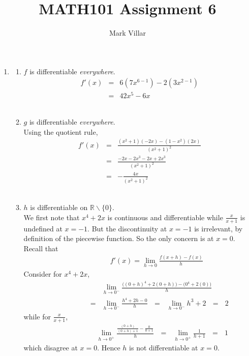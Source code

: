 \documentclass[12pt]{amsart}
\title{MATH101 Assignment 6}
\author{Mark Villar}
\begin{document}
 

\maketitle 

\begin{enumerate}
	
	\item 
	
		\begin{enumerate}
		
			\item $f$ is differentiable \emph{everywhere}.
				\begin{eqnarray}
					f'(x) & = & 6(7x^{6-1})-2(3x^{2-1}) \nonumber \\
					& = & 42 x^5-6x \nonumber
				\end{eqnarray} \\
							
			\item $g$ is differentiable \emph{everywhere}. \\
			Using the quotient rule,
				\begin{eqnarray}
					f'(x) & = &	\frac{(x^2+1)(-2x)-(1-x^2)(2x)}{(x^2+1)^2} \nonumber \\
					& = & \frac{-2x-2x^3-2x+2x^3}{(x^2+1)^2} \nonumber \\
					& = & -\frac{4x}{(x^2+1)^2} \nonumber
				\end{eqnarray}	\\	
									
			\item $h$ is differentiable on $\mathbb{R}\backslash\{0\}$. \\
			We first note that $x^4+2x$ is continuous and differentiable while $\frac{x}{x+1}$ is undefined 			at $x=-1$.  But the discontinuity at $x=-1$ is irrelevant, by definition of the piecewise function.
			So the only concern is at $x=0$. Recall that 
				\begin{eqnarray}
					\hspace{2cm} f'(x) = \lim_{h\rightarrow0} \frac{f(x+h)-f(x)}{h} \nonumber
				\end{eqnarray}
			Consider for $x^4+2x$,
				\begin{eqnarray}
					\hspace{2cm}& &\lim_{h\rightarrow0^-}\frac{\big((0+h)^4+2(0+h)\big)-\big(0^4+2(0)						\big)}{h} \nonumber \\
					& = & \lim_{h\rightarrow0^-} \frac{h^4+2h-0}{h} \text{ } = \text{ } \lim_{h\rightarrow0^-} 					h^3+2 \text{ } = \text{ } 2 \nonumber
				\end{eqnarray} 
			while for $\frac{x}{x+1}$,
				\begin{eqnarray}
					\hspace{2cm} & & \lim_{h\rightarrow0^+} \frac{\frac{(0+h)}{(0+h)+1}-\frac{0}{0+1}}{h} 					\text{ } = \text{ } \lim_{h\rightarrow0^+} \frac{1}{h+1} \text{ } = \text{ } 1 \nonumber
				\end{eqnarray}			
			which disagree at $x=0$. Hence $h$ is not differentiable at $x=0$. \\
			

\end{enumerate}
\end{enumerate}
\end{document}
